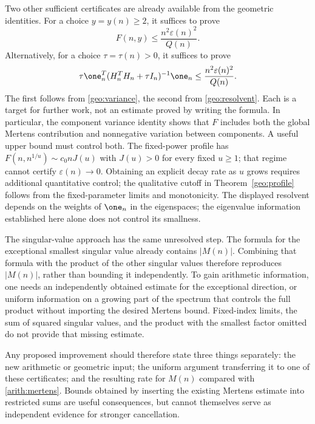 Two other sufficient certificates are already available from the geometric identities. For a choice $y=y(n)\ge2$, it suffices to prove
\begin{equation}\label{disc:component-certificate}
 F(n,y)\le\frac{n^2\varepsilon(n)^2}{Q(n)}.
\end{equation}
Alternatively, for a choice $\tau=\tau(n)>0$, it suffices to prove
\begin{equation}\label{disc:resolvent-certificate}
 \tau\one_n^T(H_n^TH_n+\tau I_n)^{-1}\one_n
 \le\frac{n^2\varepsilon(n)^2}{Q(n)}.
\end{equation}
The first follows from \eqref{geo:variance}, the second from \eqref{geo:resolvent}. Each is a target for further work, not an estimate proved by writing the formula. In particular, the component variance identity shows that $F$ includes both the global Mertens contribution and nonnegative variation between components. A useful upper bound must control both. The fixed-power profile has $F(n,n^{1/u})\sim c_0nJ(u)$ with $J(u)>0$ for every fixed $u\ge1$; that regime cannot certify $\varepsilon(n)\to0$. Obtaining an explicit decay rate as $u$ grows requires additional quantitative control; the qualitative cutoff in Theorem~\ref{geo:profile} follows from the fixed-parameter limits and monotonicity. The displayed resolvent depends on the weights of $\one_n$ in the eigenspaces; the eigenvalue information established here alone does not control its smallness.

The singular-value approach has the same unresolved step. The formula for the exceptional smallest singular value already contains $|M(n)|$. Combining that formula with the product of the other singular values therefore reproduces $|M(n)|$, rather than bounding it independently. To gain arithmetic information, one needs an independently obtained estimate for the exceptional direction, or uniform information on a growing part of the spectrum that controls the full product without importing the desired Mertens bound. Fixed-index limits, the sum of squared singular values, and the product with the smallest factor omitted do not provide that missing estimate.

Any proposed improvement should therefore state three things separately: the new arithmetic or geometric input; the uniform argument transferring it to one of these certificates; and the resulting rate for $M(n)$ compared with \eqref{arith:mertens}. Bounds obtained by inserting the existing Mertens estimate into restricted sums are useful consequences, but cannot themselves serve as independent evidence for stronger cancellation.
